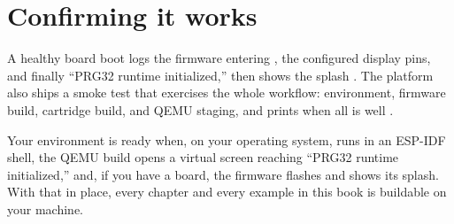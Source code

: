 \section{Confirming it works}

A healthy board boot logs the firmware entering , the configured
display pins, and finally ``PRG32 runtime initialized,'' then shows the splash
\citep{prg32tutorial}. The platform also ships a smoke test that exercises the whole
workflow: environment, firmware build, cartridge build, and QEMU staging, and
prints  when all is well \citep{prg32repo}.



\begin{prgcheck}
Your environment is ready when, on your operating system,  runs in an
ESP-IDF shell, the QEMU build opens a virtual screen reaching ``PRG32 runtime
initialized,'' and, if you have a board, the firmware flashes and shows its
splash. With that in place, every chapter and every example in this book is
buildable on your machine.
\end{prgcheck}

